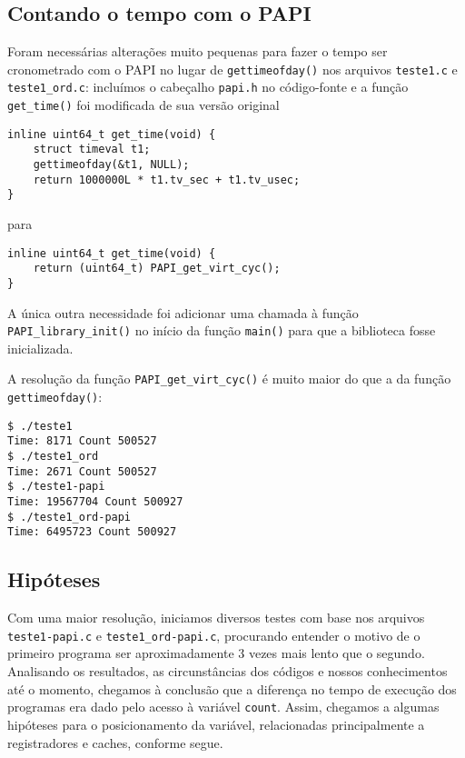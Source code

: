 \documentclass[a4paper,oneside,12pt]{article}
\begin{document}
\subsection{Contando o tempo com o PAPI}

Foram necessárias alterações muito pequenas para fazer o tempo ser cronometrado com o PAPI no lugar de {\tt gettimeofday()} nos arquivos {\tt teste1.c} e {\tt teste1\_ord.c}: incluímos o cabeçalho {\tt papi.h} no código-fonte e a função {\tt get\_time()} foi modificada de sua versão original

\begin{verbatim}
inline uint64_t get_time(void) {
    struct timeval t1;
    gettimeofday(&t1, NULL);
    return 1000000L * t1.tv_sec + t1.tv_usec;
}
\end{verbatim}

para

\begin{verbatim}
inline uint64_t get_time(void) { 
    return (uint64_t) PAPI_get_virt_cyc();
}  
\end{verbatim}

A única outra necessidade foi adicionar uma chamada à função {\tt PAPI\_library\_init()} no início da função {\tt main()} para que a biblioteca fosse inicializada.

A resolução da função {\tt PAPI\_get\_virt\_cyc()} é muito maior do que a da função {\tt gettimeofday()}:

\begin{verbatim}
$ ./teste1
Time: 8171 Count 500527
$ ./teste1_ord
Time: 2671 Count 500527
$ ./teste1-papi
Time: 19567704 Count 500927
$ ./teste1_ord-papi
Time: 6495723 Count 500927
\end{verbatim}

\subsection{Hipóteses}

Com uma maior resolução, iniciamos diversos testes com base nos arquivos {\tt teste1-papi.c} e {\tt teste1\_ord-papi.c}, procurando entender o motivo de o primeiro programa ser aproximadamente 3 vezes mais lento que o segundo. Analisando os resultados, as circunstâncias dos códigos e nossos conhecimentos até o momento, chegamos à conclusão que a diferença no tempo de execução dos programas era dado pelo acesso à variável {\tt count}. Assim, chegamos a algumas hipóteses para o posicionamento da variável, relacionadas principalmente a registradores e caches, conforme segue.
\end{document}
